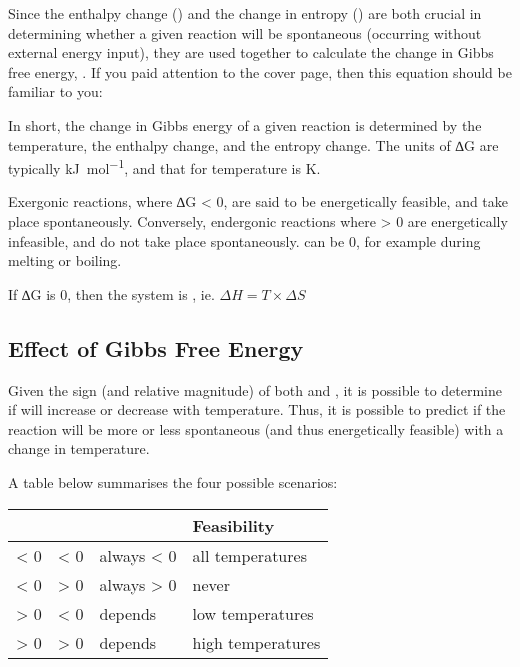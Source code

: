 		Since the enthalpy change (\enth{}) and the change in entropy (\entr{}) are both crucial in determining whether a given reaction will
		be spontaneous (occurring without external energy input), they are used together to calculate the change in Gibbs free energy, \gibb{}.
		If you paid attention to the cover page, then this equation should be familiar to you:

		\mathdiagram{
			\[ \Delta G = \Delta H - T\times \Delta S \]
		}

		In short, the change in Gibbs energy of a given reaction is determined by the temperature, the enthalpy change, and the entropy change.
		The units of ∆G are typically \si{\kilo\joule\per\mole}, and that for temperature is \si{\kelvin}.

		Exergonic reactions, where ∆G < 0, are said to be energetically feasible, and take place spontaneously. Conversely, endergonic
		reactions where \gibb{} > 0 are energetically infeasible, and do not take place spontaneously. \gibb{} can be 0, for example during
		melting or boiling.

		If ∆G is 0, then the system is , ie. $\Delta H = T\times \Delta S$

		\subsection{Effect of Gibbs Free Energy}

			Given the sign (and relative magnitude) of both \enth{} and \entr{}, it is possible to determine if \gibb{} will increase or
			decrease with temperature. Thus, it is possible to predict if the reaction will be more or less spontaneous (and thus
			energetically feasible) with a change in temperature.

			A table below summarises the four possible scenarios:

			\begin{table}[htb]\renewcommand{\arraystretch}{1.5}\begin{center}
			\begin{tabu} to 0.9\textwidth { X[c,m] | X[c,m] | X[c,m] | X[c,m] }

				\enth{}     &   \entr{} &   \gibb{}     &   Feasibility         \\ \hline

				< 0         &   < 0     &   always < 0  &   all temperatures    \\
				< 0         &   > 0     &   always > 0  &   never               \\
				> 0         &   < 0     &   depends     &   low temperatures    \\
				> 0         &   > 0     &   depends     &   high temperatures   \\

			\end{tabu}\end{center}
			\end{table}\vspace{-1em}

